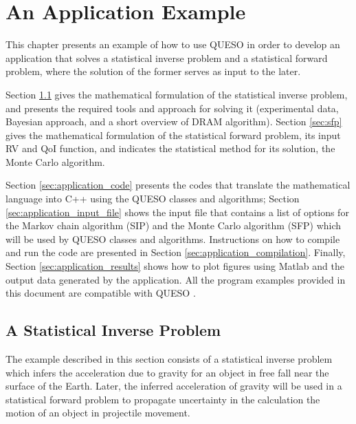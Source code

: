 \chapter{An Application Example}\label{ch-appl-example}
\thispagestyle{headings}

This chapter presents an example of how to use QUESO in order to develop an application that solves a statistical inverse problem and
a statistical forward problem, where the solution of the former serves as input to the later.


Section \ref{sec:sip} gives the mathematical formulation of the statistical inverse problem, and presents the required tools and approach for solving it (experimental data, Bayesian approach, and a short overview of DRAM algorithm). Section \ref{sec:sfp} gives the mathematical formulation of the statistical forward problem, its input RV and QoI function, and indicates the statistical method for its solution, the Monte Carlo algorithm.


Section \ref{sec:application_code} presents the codes that translate the mathematical language into C++ using the QUESO classes and algorithms; Section \ref{sec:application_input_file} shows the input file that contains  a list of options for the Markov chain algorithm  (SIP) and the Monte Carlo
algorithm (SFP) which will be used by QUESO classes and algorithms. Instructions on how to compile and run the code are presented in Section \ref{sec:application_compilation}.  Finally, Section \ref{sec:application_results} shows how to plot figures using Matlab and the output data generated by the application.
All the program examples provided in this document are compatible with QUESO \QUESOversion{}. 

\section{A Statistical Inverse Problem}\label{sec:sip}
% 


The example described in this section consists of a statistical inverse problem which infers the  acceleration due to gravity for an object in free fall near the surface of the Earth. Later, the inferred acceleration of gravity will be used in a statistical forward problem to propagate uncertainty in the calculation the motion of an object in projectile movement.


